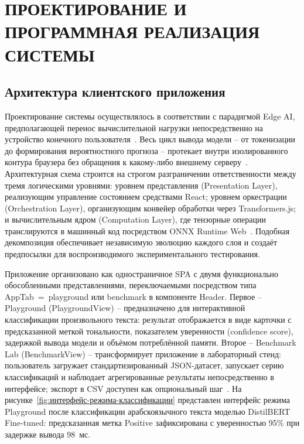 \chapter{ПРОЕКТИРОВАНИЕ И ПРОГРАММНАЯ РЕАЛИЗАЦИЯ СИСТЕМЫ}
\label{ch:проектирование_и_программная_реализация_системы}

\section{Архитектура клиентского приложения}
\label{sec:архитектура_клиентского_приложения}

Проектирование системы осуществлялось в соответствии с парадигмой Edge AI, предполагающей перенос вычислительной нагрузки непосредственно на устройство конечного пользователя~\cite{xu2024ondevice}. Весь цикл вывода модели – от токенизации до формирования вероятностного прогноза – протекает внутри изолированного контура браузера без обращения к какому-либо внешнему серверу~\cite{ruan2024webllm}. Архитектурная схема строится на строгом разграничении ответственности между тремя логическими уровнями: уровнем представления (Presentation Layer), реализующим управление состоянием средствами React; уровнем оркестрации (Orchestration Layer), организующим конвейер обработки через Transformers.js; и вычислительным ядром (Computation Layer), где тензорные операции транслируются в машинный код посредством ONNX Runtime Web~\cite{wang2024anatomizing}. Подобная декомпозиция обеспечивает независимую эволюцию каждого слоя и создаёт предпосылки для воспроизводимого экспериментального тестирования.

Приложение организовано как одностраничное SPA с двумя функционально обособленными представлениями, переключаемыми посредством типа AppTab~=~playground или benchmark в компоненте Header. Первое – Playground (PlaygroundView) – предназначено для интерактивной классификации произвольного текста: результат отображается в виде карточки с предсказанной меткой тональности, показателем уверенности (confidence score), задержкой вывода модели и объёмом потреблённой памяти. Второе – Benchmark Lab (BenchmarkView) – трансформирует приложение в лабораторный стенд: пользователь загружает стандартизированный JSON-датасет, запускает серию классификаций и наблюдает агрегированные результаты непосредственно в интерфейсе; экспорт в CSV доступен как опциональный шаг~\cite{wang2024anatomizing}. На рисунке~\ref{fig:интерфейс-режима-классификации} представлен интерфейс режима Playground после классификации арабскоязычного текста моделью DistilBERT Fine-tuned: предсказанная метка Positive зафиксирована с уверенностью 95\% при задержке вывода 98~мс.

